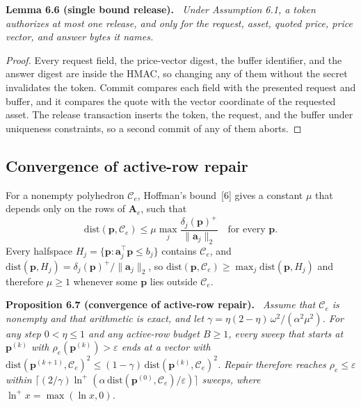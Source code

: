 \documentclass[10pt]{article}
\newcommand{\tol}{\varepsilon}
\newcommand{\pvec}{\mathbf{p}}
\newcommand{\Amat}{\mathbf{A}}
\newcommand{\avec}{\mathbf{a}}
\newcommand{\dist}{\mathrm{dist}}
\newenvironment{paperstatement}[1]{\par\medskip\noindent\textbf{#1.}\itshape\ }{\par\medskip}
\begin{document}
\begin{paperstatement}{Lemma 6.6 (single bound release)}
Under Assumption 6.1, a token authorizes at most one release, and only for the request, asset, quoted price, price vector, and answer bytes it names.
\end{paperstatement}
\begin{proof}
Every request field, the price-vector digest, the buffer identifier, and the answer digest are inside the HMAC, so changing any of them without the secret invalidates the token. Commit compares each field with the presented request and buffer, and it compares the quote with the vector coordinate of the requested asset. The release transaction inserts the token, the request, and the buffer under uniqueness constraints, so a second commit of any of them aborts.
\end{proof}

\subsection{Convergence of active-row repair}
For a nonempty polyhedron $\mathcal{C}_e$, Hoffman's bound~[6] gives a constant $\mu$ that depends only on the rows of $\Amat_e$, such that
\begin{equation*}
\dist(\pvec,\mathcal{C}_e) \le \mu \max_j \frac{\delta_j(\pvec)^{+}}{\lVert\avec_j\rVert_2} \quad \text{for every } \pvec .
\end{equation*}
Every halfspace $H_j = \{\pvec : \avec_j^{\top}\pvec \le b_j\}$ contains $\mathcal{C}_e$, and $\dist(\pvec,H_j) = \delta_j(\pvec)^{+}/\lVert\avec_j\rVert_2$, so $\dist(\pvec,\mathcal{C}_e) \ge \max_j \dist(\pvec,H_j)$ and therefore $\mu \ge 1$ whenever some $\pvec$ lies outside $\mathcal{C}_e$.

\begin{paperstatement}{Proposition 6.7 (convergence of active-row repair)}
Assume that $\mathcal{C}_e$ is nonempty and that arithmetic is exact, and let $\gamma = \eta(2-\eta)\,\omega^2/(\alpha^2\mu^2)$. For any step $0 < \eta \le 1$ and any active-row budget $B \ge 1$, every sweep that starts at $\pvec^{(k)}$ with $\rho_e(\pvec^{(k)}) > \tol$ ends at a vector with $\dist(\pvec^{(k+1)},\mathcal{C}_e)^2 \le (1-\gamma)\,\dist(\pvec^{(k)},\mathcal{C}_e)^2$. Repair therefore reaches $\rho_e \le \tol$ within $\lceil (2/\gamma) \ln^{+}(\alpha\,\dist(\pvec^{(0)},\mathcal{C}_e)/\tol) \rceil$ sweeps, where $\ln^{+} x = \max(\ln x, 0)$.
\end{paperstatement}
\end{document}

